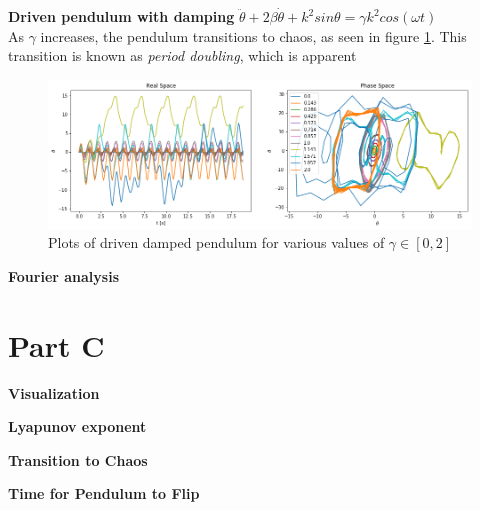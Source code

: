 \documentclass[12pt]{article}
\newenvironment{problem}[2][]{\begin{trivlist}
\item[\hskip \labelsep {\bfseries #1}\hskip \labelsep {\bfseries #2.}]}{\end{trivlist}}
\begin{document}
\begin{problem}{6}
	\textbf{Driven pendulum with damping} $\ddot{\theta}+2\beta\dot{\theta}+k^{2}sin\theta=\gamma k^{2}cos(\omega t)$ \\

As $\gamma$ increases, the pendulum transitions to chaos, as seen in figure \ref{damped}.  This transition is known as \textit{period doubling}, which is apparent 

\begin{figure}[h!]
	\centering
  	\includegraphics[scale=0.5]{../figures/dampedDriven.png}
 	\caption{Plots of driven damped pendulum for various values of $\gamma \in [0,2]$}
  	\label{damped}
\end{figure}

\end{problem}

\begin{problem}{7}
	\textbf{Fourier analysis}
\end{problem}

\section*{Part C}

\begin{problem}{1}
\textbf{Visualization}

\end{problem}

\begin{problem}{2}
\textbf{Lyapunov exponent}
\end{problem}

\begin{problem}{3}
\textbf{Transition to Chaos}
\end{problem}

\begin{problem}{4}
\textbf{Time for Pendulum to Flip}
\end{problem}
\end{document}
